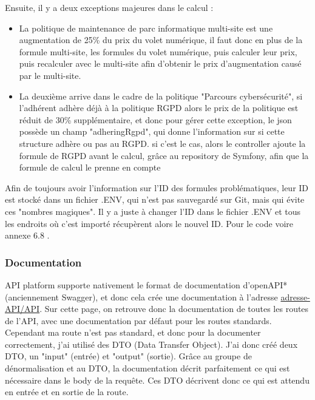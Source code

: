 \documentclass[a4paper,12pt]{report}
\begin{document}
Ensuite, il y a deux exceptions majeures dans le calcul :
\begin{itemize}
    \item La politique de maintenance de parc informatique multi-site est une augmentation de 25\% du prix du volet numérique, il faut donc en plus de la formule multi-site, les formules du volet numérique, puis calculer leur prix, puis recalculer avec le multi-site afin d'obtenir le prix d'augmentation causé par le multi-site.
    \item La deuxième arrive dans le cadre de la politique "Parcours cybersécurité", si l'adhérent adhère déjà à la politique RGPD alors le prix de la politique est réduit de 30\% supplémentaire, et donc pour gérer cette exception, le json possède un champ "adheringRgpd", qui donne l'information sur si cette structure adhère ou pas au RGPD. si c'est le cas, alors le controller ajoute la formule de RGPD avant le calcul, grâce au repository de Symfony, afin que la formule de calcul le prenne en compte
\end{itemize} 
Afin de toujours avoir l'information sur l'ID des formules problématiques, leur ID est stocké dans un fichier .ENV, qui n'est pas sauvegardé sur Git, mais qui évite ces "nombres magiques". Il y a juste à changer l'ID dans le fichier .ENV et tous les endroits où c'est importé récupèrent alors le nouvel ID. Pour le code voire annexe 6.8 .

\subsubsection{Documentation}

API platform supporte nativement le format de documentation d'openAPI* (anciennement Swagger), et donc cela crée une documentation à l'adresse \href{https://dev.API.numerobis.atd16.fr/API}{adresse-API/API}. Sur cette page, on retrouve donc la documentation de toutes les routes de l'API, avec une documentation par défaut pour les routes standards. Cependant ma route n'est pas standard, et donc pour la documenter correctement, j'ai utilisé des DTO (Data Transfer Object). J'ai donc créé deux DTO, un "input" (entrée) et "output" (sortie). Grâce au groupe de dénormalisation et au DTO, la documentation décrit parfaitement ce qui est nécessaire dans le body de la requête. Ces DTO décrivent donc ce qui est attendu en entrée et en sortie de la route.
\end{document}
